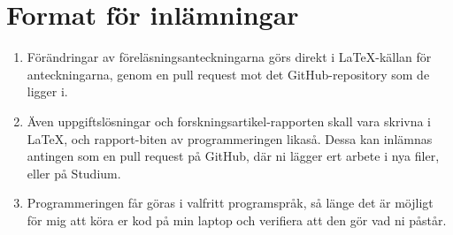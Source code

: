 \documentclass{tufte-handout}
\begin{document}
\section{Format för inlämningar}

\begin{enumerate}
	\item Förändringar av föreläsningsanteckningarna görs direkt i \LaTeX-källan för anteckningarna, genom en pull request mot det GitHub-repository som de ligger i.
	\item Även uppgiftslösningar och forskningsartikel-rapporten skall vara skrivna i \LaTeX, och rapport-biten av programmeringen likaså. Dessa kan inlämnas antingen som en pull request på GitHub, där ni lägger ert arbete i nya filer, eller på Studium.
	\item Programmeringen får göras i valfritt programspråk, så länge det är möjligt för mig att köra er kod på min laptop och verifiera att den gör vad ni påstår.
\end{enumerate}



\end{document}
